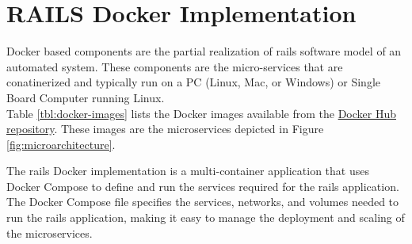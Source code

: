 \chapter{RAILS Docker Implementation}
Docker based components are the partial realization of \gls{rails} software model of an automated system. These components are the micro-services that are conatinerized and typically run on a PC (Linux, Mac, or Windows) or Single Board Computer running Linux.\vspace{5mm} \\
Table \ref{tbl:docker-images} lists the Docker images available from the \href{https://hub.docker.com/repositories/dbristow}{Docker Hub repository}. These images are the microservices depicted in Figure \ref{fig:microarchitecture}.

The \gls{rails} Docker implementation is a multi-container application that uses Docker Compose to define and run the services required for the \gls{rails} application. The Docker Compose file specifies the services, networks, and volumes needed to run the \gls{rails} application, making it easy to manage the deployment and scaling of the microservices.
